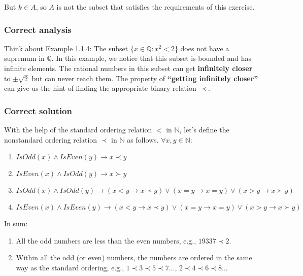 \documentclass[12pt, letterpaper, oneside]{book}
\begin{document}
But $k \in A$, so $A$ is not the subset that satisfies the requirements of this exercise.

\subsubsection{Correct analysis}

Think about Example 1.1.4: The subset \{$x \in \mathbb{Q}: x^2 < 2$\} does not have a supremum in $\mathbb{Q}$. In this
example, we notice that this subset is bounded and has infinite elements. The rational numbers in this subset can get
\textbf{infinitely closer} to $\pm \sqrt{2}$ but can never reach them. The property of \textbf{``getting infinitely
  closer''} can give us the hint of finding the appropriate binary relation $\prec$.

\subsubsection{Correct solution}

With the help of the standard ordering relation $<$ in $\mathbb{N}$, let's define the nonstandard ordering relation
$\prec$ in $\mathbb{N}$ as follows. $\forall x, y \in \mathbb{N}$:
\begin{enumerate}
  \item $IsOdd(x) \land IsEven(y) \rightarrow x \prec y$
  \item $IsEven(x) \land IsOdd(y) \rightarrow x \succ y$
  \item $IsOdd(x) \land IsOdd(y) \rightarrow (x < y \rightarrow x \prec y) \lor (x = y \rightarrow x = y) \lor
          (x > y \rightarrow x \succ y)$
  \item $IsEven(x) \land IsEven(y) \rightarrow (x < y \rightarrow x \prec y) \lor (x = y \rightarrow x = y) \lor
          (x > y \rightarrow x \succ y)$
\end{enumerate}

In sum:
\begin{enumerate}
  \item All the odd numbers are less than the even numbers, e.g., $19337 \prec 2$.
  \item Within all the odd (or even) numbers, the numbers are ordered in the same way as the standard ordering, e.g.,
        $1 \prec 3 \prec 5 \prec 7 \ldots$, $2 \prec 4 \prec 6 \prec 8 \ldots$
\end{enumerate}
\end{document}
